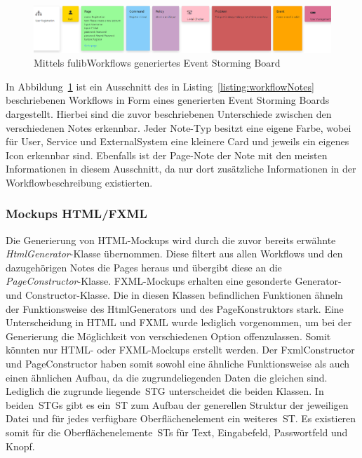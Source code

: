 \begin{figure}[h]
    \centering
    \includegraphics[width=1.0\textwidth]{images/3.1.4/board}
    \caption{Mittels fulibWorkflows generiertes Event Storming Board}
    \label{fig:generated-board}
\end{figure}

In Abbildung~\ref{fig:generated-board} ist ein Ausschnitt des in Listing~\ref{listing:workflowNotes} beschriebenen Workflows in
Form eines generierten Event Storming Boards dargestellt.
Hierbei sind die zuvor beschriebenen Unterschiede zwischen den verschiedenen Notes erkennbar.
Jeder Note-Typ besitzt eine eigene Farbe, wobei für User, Service und ExternalSystem eine kleinere Card und jeweils ein
eigenes Icon erkennbar sind.
Ebenfalls ist der Page-Note der Note mit den meisten Informationen in diesem Ausschnitt, da nur dort zusätzliche Informationen
in der Workflowbeschreibung existierten.

\subsubsection{Mockups HTML/FXML}\label{subsubsec:mockups-html/fxml}
Die Generierung von HTML-Mockups wird durch die zuvor bereits erwähnte \textit{HtmlGenerator}-Klasse übernommen.
Diese filtert aus allen Workflows und den dazugehörigen Notes die Pages heraus und übergibt diese an die \textit{PageConstructor}-Klasse.
FXML-Mockups erhalten eine gesonderte Generator- und Constructor-Klasse.
Die in diesen Klassen befindlichen Funktionen ähneln der Funktionsweise des HtmlGenerators und des PageKonstruktors stark.
Eine Unterscheidung in HTML und FXML wurde lediglich vorgenommen, um bei der Generierung die Möglichkeit von verschiedenen Option offenzulassen.
Somit könnten nur HTML- oder FXML-Mockups erstellt werden.
Der FxmlConstructor und PageConstructor haben somit sowohl eine ähnliche Funktionsweise als auch einen ähnlichen Aufbau, da die zugrundeliegenden Daten die gleichen sind.
Lediglich die zugrunde liegende~\ac{STG} unterscheidet die beiden Klassen.
In beiden~\ac{STG}s gibt es ein~\ac{ST} zum Aufbau der generellen Struktur der jeweiligen Datei und für jedes verfügbare Oberflächenelement ein weiteres~\ac{ST}.
Es existieren somit für die Oberflächenelemente~\ac{ST}s für Text, Eingabefeld, Passwortfeld und Knopf.

